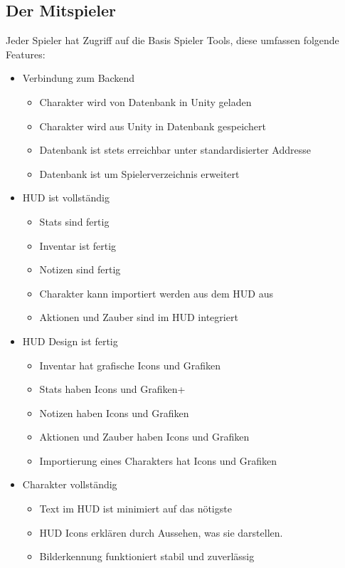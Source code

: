 \subsection{Der Mitspieler}\label{subsec:the_player}
Jeder Spieler hat Zugriff auf die Basis Spieler Tools, diese umfassen folgende Features:
\begin{itemize}
    \item Verbindung zum Backend
    \begin{itemize}
        \item Charakter wird von Datenbank in Unity geladen
        \item Charakter wird aus Unity in Datenbank gespeichert
        \item Datenbank ist stets erreichbar unter standardisierter Addresse
        \item Datenbank ist um Spielerverzeichnis erweitert
    \end{itemize}
    \item HUD ist vollständig
    \begin{itemize}
        \item Stats sind fertig
        \item Inventar ist fertig
        \item Notizen sind fertig
        \item Charakter kann importiert werden aus dem HUD aus
        \item Aktionen und Zauber sind im HUD integriert
    \end{itemize}
    \item HUD Design ist fertig
    \begin{itemize}
        \item Inventar hat grafische Icons und Grafiken
        \item Stats haben Icons und Grafiken+
        \item Notizen haben Icons und Grafiken
        \item Aktionen und Zauber haben Icons und Grafiken
        \item Importierung eines Charakters hat Icons und Grafiken
    \end{itemize}
    \item Charakter vollständig
    \begin{itemize}
        \item Text im HUD ist minimiert auf das nötigste
        \item HUD Icons erklären durch Aussehen, was sie darstellen.
        \item Bilderkennung funktioniert stabil und zuverlässig
    \end{itemize}
\end{itemize}


